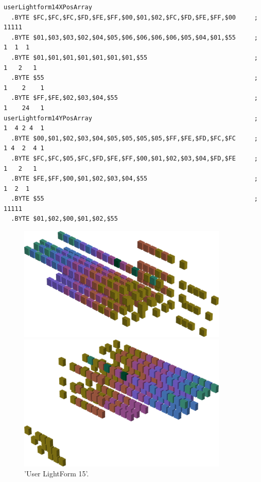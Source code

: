 \begin{minipage}[b]{0.68\linewidth}
\begin{lrbox}{\mybox}%
\begin{lstlisting}[basicstyle=\ttfamily\tiny,escapechar=\%]
userLightform14XPosArray
  .BYTE $FC,$FC,$FC,$FD,$FE,$FF,$00,$01,$02,$FC,$FD,$FE,$FF,$00     ;    11111   
  .BYTE $01,$03,$03,$02,$04,$05,$06,$06,$06,$06,$05,$04,$01,$55     ;   1  1  1  
  .BYTE $01,$01,$01,$01,$01,$01,$01,$55                             ;  1   2   1 
  .BYTE $55                                                         ; 1    2    1
  .BYTE $FF,$FE,$02,$03,$04,$55                                     ; 1    24   1
userLightform14YPosArray                                            ; 1  4 2 4  1
  .BYTE $00,$01,$02,$03,$04,$05,$05,$05,$05,$FF,$FE,$FD,$FC,$FC     ; 1 4  2  4 1
  .BYTE $FC,$FC,$05,$FC,$FD,$FE,$FF,$00,$01,$02,$03,$04,$FD,$FE     ;  1   2   1 
  .BYTE $FE,$FF,$00,$01,$02,$03,$04,$55                             ;   1  2  1  
  .BYTE $55                                                         ;    11111   
  .BYTE $01,$02,$00,$01,$02,$55
\end{lstlisting}
\end{lrbox}%
\scalebox{0.8}{\usebox{\mybox}}

\end{minipage}
%
%
\begin{minipage}[b]{0.48\linewidth}
\begin{figure}[H]
    \centering
    \begin{adjustbox}{width=5cm,margin=0cm 0cm}
      \includegraphics[width=10cm]{src/colorspace_patterns/pattern23-45.png}%
    \end{adjustbox}
    \begin{adjustbox}{width=5cm,margin=0cm 0cm}
      \includegraphics[width=10cm]{src/colorspace_patterns/pattern23-225.png}%
    \end{adjustbox}
\caption{'User LightForm 15'.}
\end{figure}
\end{minipage}
